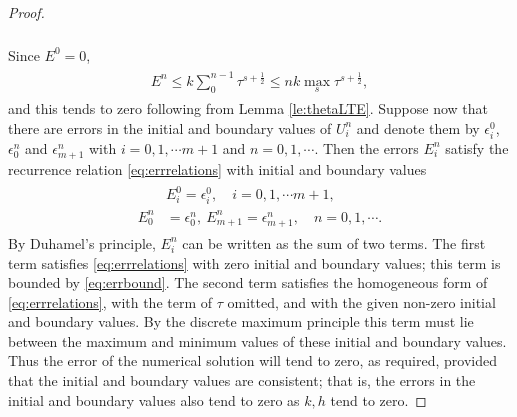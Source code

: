 \documentclass[a4paper,twoside]{ctexart}
\theoremstyle{definition}
\begin{document}
\begin{proof}
\begin{eqnarray}
\begin{aligned}
	\end{aligned}
	\end{eqnarray}
	Since $E^0 = 0$, 
	\begin{eqnarray}
	\label{eq:errbound}
	\begin{aligned}
	E^{n} 
	\le k \sum_{0}^{n-1}\tau^{s+\frac{1}{2}} \le nk \max_{s} \tau^{s+\frac{1}{2}},
	\end{aligned}
	\end{eqnarray}
	and this tends to zero following from Lemma \ref{le:thetaLTE}. Suppose now that there are errors in the initial and boundary values of $U_i^n$ and denote them by $\epsilon_i^0$, $\epsilon_0^n$ and $\epsilon_{m+1}^n$ with $i = 0,1,\cdots m+1$ and $n = 0,1,\cdots$. Then the errors $E_i^n$  satisfy the
	recurrence relation \eqref{eq:errrelations} with initial and boundary values
	\begin{eqnarray}
	\begin{aligned}
	&E_i^0 = \epsilon_i^0, \quad i = 0,1,\cdots m+1,\\
	E_0^n &= \epsilon_0^n, \ E_{m+1}^n = \epsilon_{m+1}^n, \quad n = 0,1,\cdots.
	\end{aligned}
	\end{eqnarray}
	By Duhamel's principle, $E_i^n$ can be written as the sum of two
	terms. The first term satisfies \eqref{eq:errrelations} with zero initial and boundary
	values; this term is bounded by \eqref{eq:errbound}. The second term satisfies the
	homogeneous form of \eqref{eq:errrelations}, with the term of $\tau$ omitted, and with the given non-zero initial and boundary values. By the discrete maximum principle
	this term must lie between the maximum and minimum values of these
	initial and boundary values. Thus the error of the numerical solution
	will tend to zero, as required, provided that
	the initial and boundary values are consistent; that is, the errors in the
	initial and boundary values also tend to zero as $k,h$ tend to zero.
\end{proof}
\end{document}

